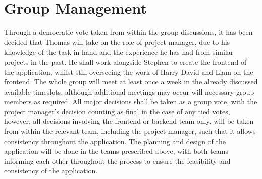 \documentclass[11pt, oneside, a4paper]{article}
\begin{document}
\section{Group Management}
Through a democratic vote taken from within the group discussions, it has been decided that Thomas will take on
the role of project manager, due to his knowledge of the task in hand and the experience he has had from similar
projects in the past. He shall work alongside Stephen to create the frontend of the application, whilst still
overseeing the work of Harry David and Liam on the frontend. The whole group will meet at least once a week in
the already discussed available timeslots, although additional meetings may occur will necessary group members as
required. All major decisions shall be taken as a group vote, with the project manager’s decision counting as final
in the case of any tied votes, however, all decisions involving the frontend or backend team only, will be taken
from within the relevant team, including the project manager, such that it allows consistency throughout the
application.
The planning and design of the application will be done in the teams prescribed above, with both teams informing
each other throughout the process to ensure the feasibility and consistency of the application.
\end{document}
